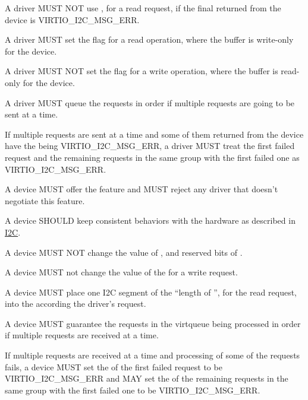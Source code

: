 A driver MUST NOT use , for a read request, if the final
 returned from the device is VIRTIO_I2C_MSG_ERR.

A driver MUST set the  flag for a read operation,
where the buffer is write-only for the device.

A driver MUST NOT set the  flag for a write
operation, where the buffer is read-only for the device.

A driver MUST queue the requests in order if multiple requests are going to
be sent at a time.

If multiple requests are sent at a time and some of them returned from the
device have the  being VIRTIO_I2C_MSG_ERR, a driver MUST treat
the first failed request and the remaining requests in the same group with
the first failed one as VIRTIO_I2C_MSG_ERR.


A device MUST offer the  feature and
MUST reject any driver that doesn't negotiate this feature.

A device SHOULD keep consistent behaviors with the hardware as described in
\hyperref[intro:I2C]{I2C}.

A device MUST NOT change the value of , and reserved bits of
.

A device MUST not change the value of the  for a write request.

A device MUST place one I2C segment of the ``length of '', for the
read request, into the  according the driver's request.

A device MUST guarantee the requests in the virtqueue being processed in order
if multiple requests are received at a time.

If multiple requests are received at a time and processing of some of the
requests fails, a device MUST set the  of the first failed
request to be VIRTIO_I2C_MSG_ERR and MAY set the  of the
remaining requests in the same group with the first failed one
to be VIRTIO_I2C_MSG_ERR.

